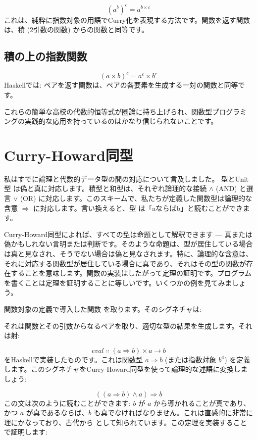 \[(a^{b})^{c} = a^{b \times c}\]
これは、純粋に指数対象の用語でCurry化を表現する方法です。関数を返す関数は、積 (2引数の関数) からの関数と同等です。

\subsection{積の上の指数関数}

\[(a \times b)^{c} = a^{c} \times b^{c}\]
Haskellでは: ペアを返す関数は、ペアの各要素を生成する一対の関数と同等です。

これらの簡単な高校の代数的恒等式が圏論に持ち上げられ、関数型プログラミングの実践的な応用を持っているのはかなり信じられないことです。

\section{Curry-Howard同型}

私はすでに論理と代数的データ型の間の対応について言及しました。 型とUnit型 \code{()} は偽と真に対応します。積型と和型は、それぞれ論理的な接続 $\wedge$ (AND) と選言 $\vee$ (OR) に対応します。このスキームで、私たちが定義した関数型は論理的な含意 $\Rightarrow$ に対応します。言い換えると、型  は「aならばb」と読むことができます。

Curry-Howard同型によれば、すべての型は命題として解釈できます --- 真または偽かもしれない言明または判断です。そのような命題は、型が居住している場合は真と見なされ、そうでない場合は偽と見なされます。特に、論理的な含意は、それに対応する関数型が居住している場合に真であり、それはその型の関数が存在することを意味します。関数の実装はしたがって定理の証明です。プログラムを書くことは定理を証明することに等しいです。いくつかの例を見てみましょう。

関数対象の定義で導入した関数  を取ります。そのシグネチャは: 

それは関数とその引数からなるペアを取り、適切な型の結果を生成します。それは射: 

\[\mathit{eval} \Colon (a \Rightarrow b) \times a \to b\]
をHaskellで実装したものです。これは関数型 $a \Rightarrow b$ (または指数対象 $b^a$) を定義します。このシグネチャをCurry-Howard同型を使って論理的な述語に変換しましょう: 

\[((a \Rightarrow b) \wedge a) \Rightarrow b\]
この文は次のように読むことができます: $b$ が $a$ から導かれることが真であり、かつ $a$ が真であるならば、$b$ も真でなければなりません。これは直感的に非常に理にかなっており、古代から  として知られています。この定理を実装することで証明します: 

